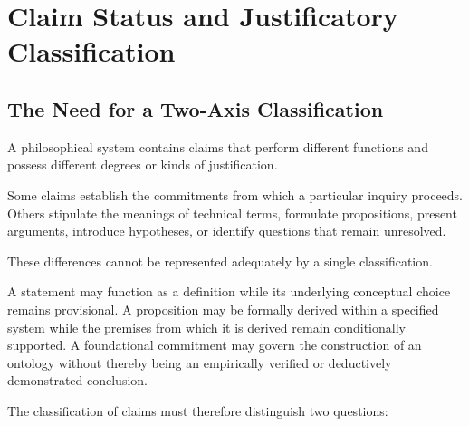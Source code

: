 %
%
%
%

\section{Claim Status and Justificatory Classification}
\label{sec:claim-status-and-justificatory-classification}

\subsection{The Need for a Two-Axis Classification}

A philosophical system contains claims that perform
different functions and possess different degrees
or kinds of justification.

Some claims establish the commitments from which
a particular inquiry proceeds. Others stipulate
the meanings of technical terms, formulate
propositions, present arguments, introduce
hypotheses, or identify questions that remain
unresolved.

These differences cannot be represented adequately
by a single classification.

A statement may function as a definition while
its underlying conceptual choice remains provisional.
A proposition may be formally derived within a
specified system while the premises from which
it is derived remain conditionally supported.
A foundational commitment may govern the construction
of an ontology without thereby being an empirically
verified or deductively demonstrated conclusion.

The classification of claims must therefore
distinguish two questions:

